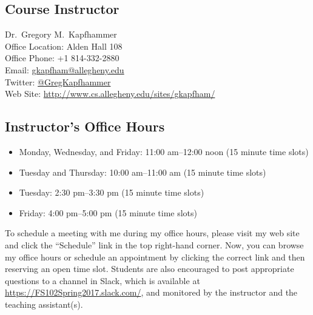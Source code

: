 

\usepackage[compact]{titlesec}



\subsection*{Course Instructor}
Dr.\ Gregory M.\ Kapfhammer\\
\noindent Office Location: Alden Hall 108 \\
\noindent Office Phone: +1 814-332-2880 \\
\noindent Email: \url{gkapfham@allegheny.edu} \\
\noindent Twitter: \url{@GregKapfhammer} \\
\noindent Web Site: \url{http://www.cs.allegheny.edu/sites/gkapfham/}

\subsection*{Instructor's Office Hours}

\begin{itemize}
  \itemsep0em

  \item Monday, Wednesday, and Friday: 11:00 am--12:00 noon (15 minute time slots)

  \item Tuesday and Thursday: 10:00 am--11:00 am (15 minute time slots)

  \item Tuesday: 2:30 pm--3:30 pm (15 minute time slots)

  \item Friday: 4:00 pm--5:00 pm (15 minute time slots)

\end{itemize}

\vspace*{-.1in}

\noindent To schedule a meeting with me during my office hours, please visit my web site and click the ``Schedule'' link
in the top right-hand corner. Now, you can browse my office hours or schedule an appointment by clicking the correct
link and then reserving an open time slot. Students are also encouraged to post appropriate questions to a channel in
Slack, which is available at \url{https://FS102Spring2017.slack.com/}, and monitored by the instructor and the
teaching assistant(s).

